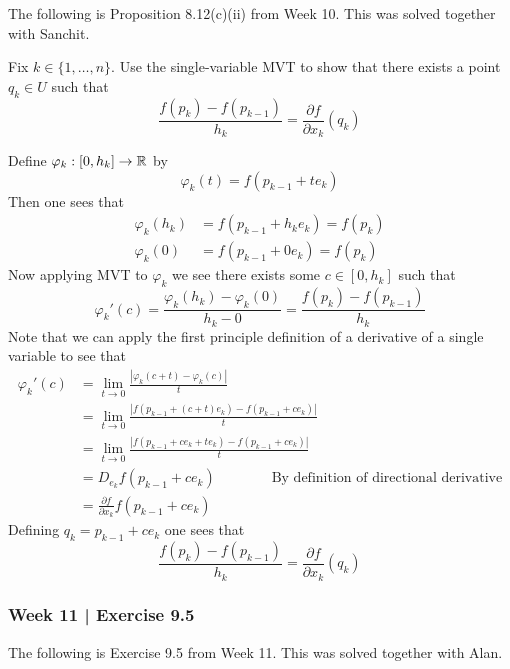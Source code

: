 The following is Proposition 8.12(c)(ii) from Week 10.
This was solved together with Sanchit.
\vspace{-2ex}
\begin{exr}[num=8.12(c)(ii)]
    Fix $k\in \{1,\ldots,n\}$. Use the single-variable MVT to show that there
    exists a point $q_k\in U$ such that
    \[ \dfrac{f(p_k)-f(p_{k-1})}{h_k} = \dfrac{\partial f}{\partial x_k}(q_k) \]
\end{exr}
\vspace{-2ex}
\begin{pf}[source=Sanchit]
    Define $\varphi_k:[0, h_k] \to \mathbb{R}$ by
    \[
        \varphi_k(t) = f(p_{k-1}+te_k)
    \]
    Then one sees that
    \begin{align*}
        \varphi_k(h_k) &= f(p_{k-1}+h_ke_k) = f(p_k) \\
        \varphi_k(0) &= f(p_{k-1}+0e_k) = f(p_k)
    \end{align*}
    Now applying MVT to $\varphi_k$ we see there exists some $c \in [0, h_k]$
    such that
    \begin{equation*}
        \varphi_k'(c) = \frac{\varphi_k(h_k) - \varphi_k(0)}{h_k - 0}
        = \frac{f(p_k) - f(p_{k-1})}{h_k}
    \end{equation*}
    Note that we can apply the first principle definition of a derivative of a
    single variable to see that
    \begin{align*}
        \varphi_k'(c) &= \lim_{t\to0} \frac{|\varphi_k(c+t)-\varphi_k(c)|}{t} \\
        &= \lim_{t \to 0} \frac{|f(p_{k-1}+(c+t)e_k)-f(p_{k-1}+ce_k)|}{t} \\
        &= \lim_{t \to 0} \frac{|f(p_{k-1}+ce_k+te_k)-f(p_{k-1}+ce_k)|}{t} \\
        &= D_{e_k}f(p_{k-1}+ce_k) \qquad \qquad
        \text{By definition of directional derivative} \\
        &= \frac{\partial f}{\partial x_k}f(p_{k-1}+ce_k)
    \end{align*}
    Defining $q_k = p_{k-1}+ce_k$ one sees that
    \[ \dfrac{f(p_k)-f(p_{k-1})}{h_k} = \dfrac{\partial f}{\partial x_k}(q_k) \]
\end{pf}

\newpage
\subsubsection{Week 11 | Exercise 9.5}

The following is Exercise 9.5 from Week 11.
This was solved together with Alan.

